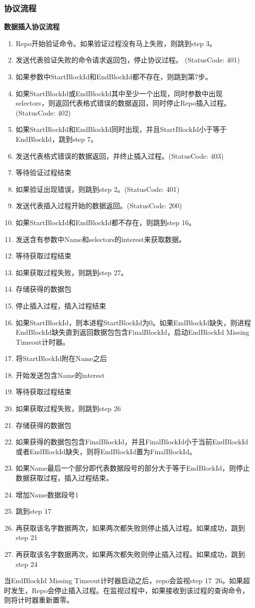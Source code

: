 \subsubsection{协议流程}

\textbf{数据插入协议流程}

\begin{enumerate}[step 1.]
\item Repo开始验证命令。如果验证过程没有马上失败，则跳到step 3。
\item 发送代表验证失败的命令请求返回包，停止协议过程。 (StatusCode: 401)
\item 如果参数中StartBlockId和EndBlockId都不存在，则跳到第7步。
\item 如果StartBlockId或EndBlockId其中至少一个出现，同时参数中出现selectors，则返回代表格式错误的数据返回，同时停止Repo插入过程。(StatusCode: 402)
\item 如果StartBlockId和EndBlockId同时出现，并且StartBlockId小于等于EndBlockId，跳到step 7。
\item 发送代表格式错误的数据返回，并终止插入过程。(StatusCode: 403)
\item 等待验证过程结束
\item 如果验证出现错误，则跳到step 2。(StatusCode: 401)
\item 发送代表插入过程开始的数据返回。(StatusCode: 200)
\item 如果StartBlockId和EndBlockId都不存在，则跳到step 16。
\item 发送含有参数中Name和selectors的interest来获取数据。
\item 等待获取过程结束
\item 如果获取过程失败，则跳到step 27。
\item 存储获得的数据包
\item 停止插入过程，插入过程结束
\item 如果StartBlockId，则本进程StartBlockId为0。如果EndBlockId缺失，则进程EndBlockId缺失直到返回数据包包含FinalBlockId，启动EndBlockId Missing Timeout计时器。
\item 将StartBlockId附在Name之后
\item 开始发送包含Name的interest
\item 等待获取过程结束
\item 如果获取过程失败，则跳到step 26
\item 存储获得的数据包
\item 如果获得的数据包包含FinalBlockId，并且FinalBlockId小于当前EndBlockId或者EndBlockId缺失，则将EndBlockId置为FinalBlockId。
\item 如果Name最后一个部分即代表数据段号的部分大于等于EndBlockId，则停止数据获取过程，插入过程结束。
\item 增加Name数据段号1
\item 跳到step 17
\item 再获取该名字数据两次，如果两次都失败则停止插入过程。如果成功，跳到step 21
\item 再获取该名字数据两次，如果两次都失败则停止插入过程。如果成功，跳到step 24
\end{enumerate}
当EndBlockId Missing Timeout计时器启动之后，repo会监视step 17~26。如果超时发生，Repo会停止插入过程。在监视过程中，如果接收到该过程的查询命令，则将计时器重新置零。

